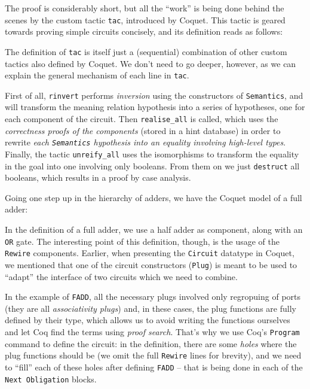 
            The proof is considerably short, but all the ``work'' is being done behind the scenes by
            the custom tactic \texttt{tac}, introduced by Coquet. This tactic is geared towards
            proving simple circuits concisely, and its definition reads as follows:


            The definition of \texttt{tac} is itself just a (sequential) combination of other custom
            tactics also defined by Coquet. We don't need to go deeper, however, as we can explain
            the general mechanism of each line in \texttt{tac}.

            First of all, \texttt{rinvert} performs \emph{inversion} using the constructors of
            \texttt{Semantics}, and will transform the meaning relation hypothesis into a series of
            hypotheses, one for each component of the circuit. Then \texttt{realise\_all} is called,
            which uses the \emph{correctness proofs of the components} (stored in a hint database)
            in order to rewrite \emph{each \texttt{Semantics} hypothesis into an equality involving
                high-level types}. Finally, the tactic \texttt{unreify\_all} uses the isomorphisms
            to transform the equality in the goal into one involving only booleans. From them on we
            just \texttt{destruct} all booleans, which results in a proof by case analysis.

            Going one step up in the hierarchy of adders, we have the Coquet model of a full adder:


            In the definition of a full adder, we use a half adder as component, along with an
            \texttt{OR} gate. The interesting point of this definition, though, is the usage of the
            \texttt{Rewire} components. Earlier, when presenting the \texttt{Circuit} datatype in
            Coquet, we mentioned that one of the circuit constructors (\texttt{Plug}) is meant to be
            used to ``adapt'' the interface of two circuits which we need to combine.

            In the example of \texttt{FADD}, all the necessary plugs involved only regropuing of
            ports (they are all \emph{associativity plugs}) and, in these cases, the plug functions
            are fully defined by their type, which allows us to avoid writing the functions
            ourselves and let Coq find the terms using \emph{proof search}. That's why we use Coq's
            \texttt{Program} command to define the circuit: in the definition, there are some
            \emph{holes} where the plug functions should be (we omit the full \texttt{Rewire} lines
            for brevity), and we need to ``fill'' each of these holes after defining \texttt{FADD}
            -- that is being done in each of the \texttt{Next Obligation} blocks.

